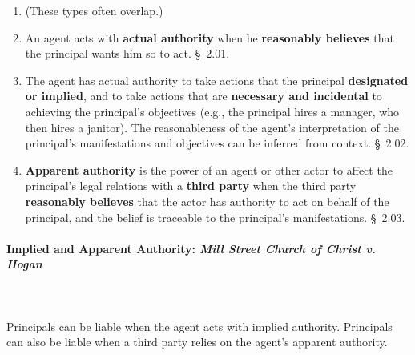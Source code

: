 \begin{enumerate}
    \item (These types often overlap.)
    \item An agent acts with \textbf{actual authority} when he 
    \textbf{reasonably believes} that the principal wants him so to act. \S\ 
    2.01.
    \item The agent has actual authority to take actions that the principal 
    \textbf{designated or implied}, and to take actions that are 
    \textbf{necessary and incidental} to achieving the principal's objectives 
    (e.g., the principal hires a manager, who then hires a janitor).  The 
    reasonableness of the agent's interpretation of the principal's 
    manifestations and objectives can be inferred from context. \S\ 2.02.
    \item \textbf{Apparent authority} is the power of an agent or other actor 
    to affect the principal's legal relations with a \textbf{third party} when 
    the third party \textbf{reasonably believes} that the actor has authority 
    to act on behalf of the principal, and the belief is traceable to the 
    principal's manifestations. \S\ 2.03.
\end{enumerate}

\paragraph{Implied and Apparent Authority: \emph{Mill Street Church of Christ 
v. Hogan}}
\label{par:mill}
~\\\\
Principals can be liable when the agent acts with implied authority. 
Principals can also be liable when a third party relies on the agent's 
apparent authority.

